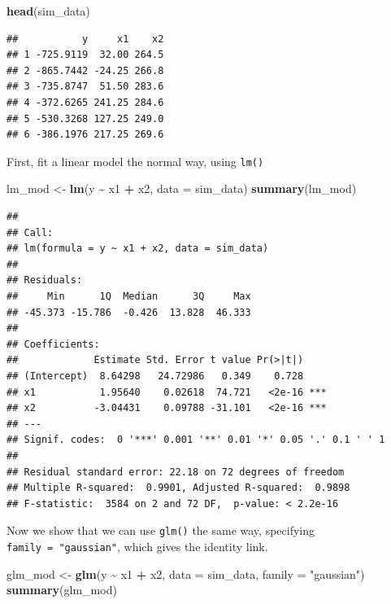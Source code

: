 \documentclass[
]{book}
\newenvironment{Shaded}{\begin{snugshade}}{\end{snugshade}}
\newcommand{\DataTypeTok}[1]{\textcolor[rgb]{0.13,0.29,0.53}{#1}}
\newcommand{\KeywordTok}[1]{\textcolor[rgb]{0.13,0.29,0.53}{\textbf{#1}}}
\newcommand{\NormalTok}[1]{#1}
\newcommand{\OperatorTok}[1]{\textcolor[rgb]{0.81,0.36,0.00}{\textbf{#1}}}
\newcommand{\StringTok}[1]{\textcolor[rgb]{0.31,0.60,0.02}{#1}}
\begin{document}
\begin{Shaded}
\begin{Highlighting}[]
\KeywordTok{head}\NormalTok{(sim\_data)}
\end{Highlighting}
\end{Shaded}

\begin{verbatim}
##           y     x1    x2
## 1 -725.9119  32.00 264.5
## 2 -865.7442 -24.25 266.8
## 3 -735.8747  51.50 283.6
## 4 -372.6265 241.25 284.6
## 5 -530.3268 127.25 249.0
## 6 -386.1976 217.25 269.6
\end{verbatim}

First, fit a linear model the normal way, using \texttt{lm()}

\begin{Shaded}
\begin{Highlighting}[]
\NormalTok{lm\_mod \textless{}{-}}\StringTok{ }\KeywordTok{lm}\NormalTok{(y }\OperatorTok{\textasciitilde{}}\StringTok{ }\NormalTok{x1 }\OperatorTok{+}\StringTok{ }\NormalTok{x2, }\DataTypeTok{data =}\NormalTok{ sim\_data)}
\KeywordTok{summary}\NormalTok{(lm\_mod)}
\end{Highlighting}
\end{Shaded}

\begin{verbatim}
## 
## Call:
## lm(formula = y ~ x1 + x2, data = sim_data)
## 
## Residuals:
##     Min      1Q  Median      3Q     Max 
## -45.373 -15.786  -0.426  13.828  46.333 
## 
## Coefficients:
##             Estimate Std. Error t value Pr(>|t|)    
## (Intercept)  8.64298   24.72986   0.349    0.728    
## x1           1.95640    0.02618  74.721   <2e-16 ***
## x2          -3.04431    0.09788 -31.101   <2e-16 ***
## ---
## Signif. codes:  0 '***' 0.001 '**' 0.01 '*' 0.05 '.' 0.1 ' ' 1
## 
## Residual standard error: 22.18 on 72 degrees of freedom
## Multiple R-squared:  0.9901, Adjusted R-squared:  0.9898 
## F-statistic:  3584 on 2 and 72 DF,  p-value: < 2.2e-16
\end{verbatim}

Now we show that we can use \texttt{glm()} the same way, specifying \texttt{family\ =\ "gaussian"}, which gives the identity link.

\begin{Shaded}
\begin{Highlighting}[]
\NormalTok{glm\_mod \textless{}{-}}\StringTok{ }\KeywordTok{glm}\NormalTok{(y }\OperatorTok{\textasciitilde{}}\StringTok{ }\NormalTok{x1 }\OperatorTok{+}\StringTok{ }\NormalTok{x2, }\DataTypeTok{data =}\NormalTok{ sim\_data, }\DataTypeTok{family =} \StringTok{"gaussian"}\NormalTok{)}
\KeywordTok{summary}\NormalTok{(glm\_mod)}
\end{Highlighting}
\end{Shaded}
\end{document}
